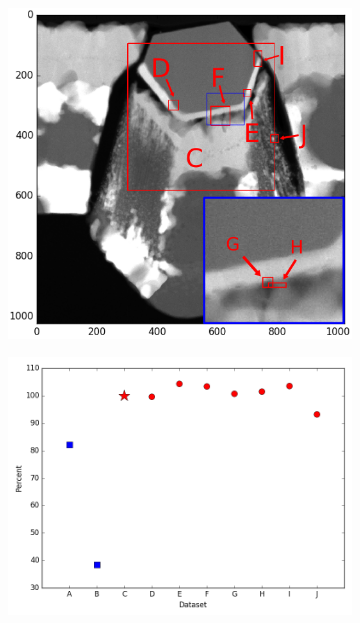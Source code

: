 \begin{figure}
	\begin{subfigure}{.5\textwidth}
		\centering
		\includegraphics[width=\linewidth]{"fig/heated-images-in-overview-ink2"}
		\caption{}
		\label{fig:heated-images-in-overview}
	\end{subfigure}%
	\begin{subfigure}{.5\textwidth}
		\centering
		\includegraphics[width=\linewidth]{"fig/heated-matching-values"}
		\caption{}
		\label{fig:heated-matching-values}
	\end{subfigure}
\end{figure}

